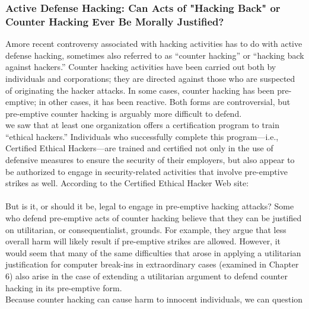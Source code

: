 \documentclass[12pt]{article}
\theoremstyle{definition}
\begin{document}
\subsubsection{Active Defense Hacking: Can Acts of "Hacking Back" or Counter Hacking Ever Be Morally Justified?}
Amore recent controversy associated with hacking activities has to do with active defense
hacking, sometimes also referred to as “counter hacking” or “hacking back against
hackers.” Counter hacking activities have been carried out both by individuals and
corporations; they are directed against those who are suspected of originating the hacker
attacks. In some cases, counter hacking has been pre-emptive; in other cases, it has been
reactive. Both forms are controversial, but pre-emptive counter hacking is arguably more
difficult to defend.\\
we saw that at least one organization offers a certification program to
train “ethical hackers.” Individuals who successfully complete this program—i.e., Certified
Ethical Hackers—are trained and certified not only in the use of defensive measures
to ensure the security of their employers, but also appear to be authorized to engage in security-related activities that involve pre-emptive strikes as well. According to the Certified Ethical Hacker Web site:\\
\\
But is it, or should it be, legal to engage in pre-emptive hacking attacks? Some who
defend pre-emptive acts of counter hacking believe that they can be justified on
utilitarian, or consequentialist, grounds. For example, they argue that less overall
harm will likely result if pre-emptive strikes are allowed. However, it would seem
that many of the same difficulties that arose in applying a utilitarian justification for
computer break-ins in extraordinary cases (examined in Chapter 6) also arise in the case
of extending a utilitarian argument to defend counter hacking in its pre-emptive form.\\
Because counter hacking can cause harm to innocent individuals, we can question
\end{document}
